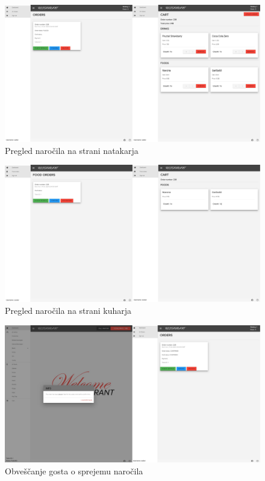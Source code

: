 \documentclass[a4paper, 12pt]{book}
\begin{document}
\begin{figure}[!htb]
\begin{center}
\includegraphics[width=14.5cm]{opis2.jpg}
\caption{Pregled naročila na strani natakarja}
\label{Opis3}
\end{center}
\end{figure}
	
\begin{figure}[!htb]
\begin{center}
\includegraphics[width=14.5cm]{opis3.jpg}
\caption{Pregled naročila na strani kuharja}
\label{Opis4}
\end{center}
\end{figure}

\begin{figure}[!htb]
\begin{center}
\includegraphics[width=14.5cm]{opis5.jpg}
\caption{Obveščanje gosta o sprejemu naročila}
\label{Opis5}
\end{center}
\end{figure}
\end{document}
